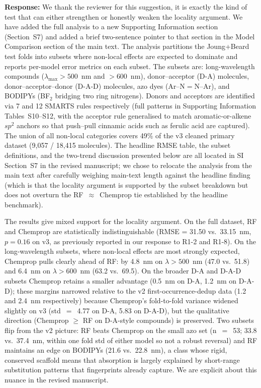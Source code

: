 \documentclass[11pt]{article}
\newcommand{\response}[1]{\noindent\textbf{Response:} #1\par\medskip}
\begin{document}
\response{We thank the reviewer for this suggestion, it is exactly the kind of test that can either strengthen or honestly weaken the locality argument. We have added the full analysis to a new Supporting Information section (Section~S7) and added a brief two-sentence pointer to that section in the Model Comparison section of the main text. The analysis partitions the Joung+Beard test folds into subsets where non-local effects are expected to dominate and reports per-model error metrics on each subset. The subsets are: long-wavelength compounds ($\lambda_{\max} > 500$~nm and $> 600$~nm), donor--acceptor (D-A) molecules, donor--acceptor--donor (D-A-D) molecules, azo dyes (Ar--N$=$N--Ar), and BODIPYs (BF$_2$ bridging two ring nitrogens). Donors and acceptors are identified via 7 and 12 SMARTS rules respectively (full patterns in Supporting Information Tables~S10--S12, with the acceptor rule generalised to match aromatic-or-alkene $sp^2$ anchors so that push--pull cinnamic acids such as ferulic acid are captured). The union of all non-local categories covers 49\% of the v3 cleaned primary dataset (9{,}057 / 18{,}415 molecules). The headline RMSE table, the subset definitions, and the two-trend discussion presented below are all located in SI Section~S7 in the revised manuscript; we chose to relocate the analysis from the main text after carefully weighing main-text length against the headline finding (which is that the locality argument is supported by the subset breakdown but does not overturn the RF~$\approx$~Chemprop tie established by the headline benchmark).

The results give mixed support for the locality argument. On the full dataset, RF and Chemprop are statistically indistinguishable (RMSE = 31.50 vs.\ 33.15~nm, $p = 0.16$ on v3, as previously reported in our response to R1-2 and R1-8). On the long-wavelength subsets, where non-local effects are most strongly expected, Chemprop pulls clearly ahead of RF: by 4.8~nm on $\lambda > 500$~nm (47.0 vs.\ 51.8) and 6.4~nm on $\lambda > 600$~nm (63.2 vs.\ 69.5). On the broader D-A and D-A-D subsets Chemprop retains a smaller advantage (0.5~nm on D-A, 1.2~nm on D-A-D); these margins narrowed relative to the v2 first-occurrence-dedup data (1.2 and 2.4~nm respectively) because Chemprop's fold-to-fold variance widened slightly on v3 (std~$=$~4.77 on D-A, 5.83 on D-A-D), but the qualitative direction (Chemprop $\geq$ RF on D-A-style compounds) is preserved. Two subsets flip from the v2 picture: RF beats Chemprop on the small azo set (n~$=$~53; 33.8 vs.\ 37.4~nm, within one fold std of either model so not a robust reversal) and RF maintains an edge on BODIPYs (21.6 vs.\ 22.8~nm), a class whose rigid, conserved scaffold means that absorption is largely explained by short-range substitution patterns that fingerprints already capture. We are explicit about this nuance in the revised manuscript.

}
\end{document}
